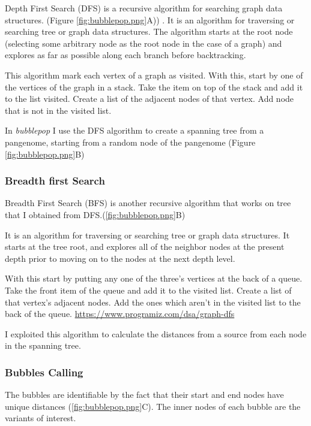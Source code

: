 Depth First Search (DFS) \cite{korf1985depth} is a recursive algorithm for searching graph data structures. (Figure \ref{fig:bubblepop.png}A)) . 
It is an algorithm for traversing or searching tree or graph data structures. The algorithm starts at the root node (selecting some arbitrary node as the root node in the case of a graph) and explores as far as possible along each branch before backtracking.\cite{wiki:DFS}

This algorithm mark each vertex of a graph as visited. With this, start by one of the vertices of the graph in a stack. Take the item on top of the stack and add it to the list visited. Create a list of the adjacent nodes of that vertex. Add node that is not in the visited list.

In \textit{bubblepop} I use the DFS algorithm to create a spanning tree from a pangenome, starting from a random node of the pangenome (Figure \ref{fig:bubblepop.png}B) %



\subsubsection{Breadth first Search}
Breadth First Search (BFS) \cite{beamer2012direction} is another recursive algorithm that works on tree that I obtained from DFS.(\ref{fig:bubblepop.png}B)

It is an algorithm for traversing or searching tree or graph data structures. It starts at the tree root, and explores all of the neighbor nodes at the present depth prior to moving on to the nodes at the next depth level.\cite{wiki:BFS}

With this start by putting any one of the three's vertices at the back of a queue.
Take the front item of the queue and add it to the visited list.
Create a list of that vertex's adjacent nodes. Add the ones which aren't in the visited list to the back of the queue. \url{https://www.programiz.com/dsa/graph-dfs}

I exploited this algorithm to calculate the distances from a source from each node in the spanning tree.



\subsubsection{Bubbles Calling}
The bubbles are identifiable by the fact that their start and end nodes have unique distances (\ref{fig:bubblepop.png}C). The inner nodes of each bubble are the variants of interest. 

